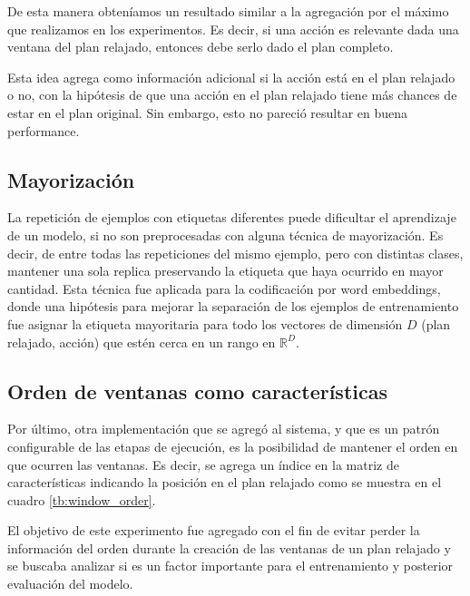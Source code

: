 De esta manera obteníamos un resultado similar a la agregación por el máximo que
realizamos en los experimentos. Es decir, si una acción es relevante dada una
ventana del plan relajado, entonces debe serlo dado el plan completo.

Esta idea agrega como información adicional si la acción está en el plan
relajado o no, con la hipótesis de que una acción en el plan relajado tiene más
chances de estar en el plan original. Sin embargo, esto no pareció resultar en
buena performance.

\subsection{Mayorización}

La repetición de ejemplos con etiquetas diferentes puede dificultar el
aprendizaje de un modelo, si no son preprocesadas con alguna técnica de
mayorización. Es decir, de entre todas las repeticiones del mismo ejemplo, pero
con distintas clases, mantener una sola replica preservando la etiqueta que haya
ocurrido en mayor cantidad. Esta técnica fue aplicada para la codificación por
word embeddings, donde una hipótesis para mejorar la separación de los ejemplos
de entrenamiento fue asignar la etiqueta mayoritaria para todo los vectores de
dimensión $D$ (plan relajado, acción) que estén cerca en un rango en
$\mathbb{R}^{D}$.

\subsection{Orden de ventanas como características}

Por último, otra implementación que se agregó al sistema, y que es un patrón
configurable de las etapas de ejecución, es la posibilidad de mantener el orden
en que ocurren las ventanas. Es decir, se agrega un índice en la matriz de
características indicando la posición en el plan relajado como se muestra en el
cuadro \ref{tb:window_order}.

\begin{table}[h!]
\centering
{}
 \caption{Ejemplos etiquetados a partir de un plan relajado y una acción.}
 \label{tb:window_order}
\end{table}

El objetivo de este experimento fue agregado con el fin de evitar perder la
información del orden durante la creación de las ventanas de un plan relajado y
se buscaba analizar si es un factor importante para el entrenamiento y posterior
evaluación del modelo.